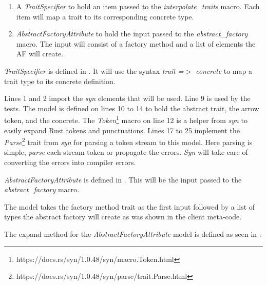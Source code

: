 \begin{enumerate}
	\item A \textit{TraitSpecifier} to hold an item passed to the \textit{interpolate\_traits} macro.
	      Each item will map a trait to its corresponding concrete type.
	\item \textit{AbstractFactoryAttribute} to hold the input passed to the \textit{abstract\_factory} macro.
	      The input will consist of a factory method and a list of elements the AF will create.
\end{enumerate}

\textit{TraitSpecifier} is defined in .
It will use the syntax \textit{trait =$>$ concrete} to map a trait type to its concrete definition.


Lines 1 and 2 import the \textit{syn} elements that will be used.
Line 9 is used by the tests.
The model is defined on lines 10 to 14 to hold the abstract trait, the arrow token, and the concrete.
The \textit{Token}\footnote{https://docs.rs/syn/1.0.48/syn/macro.Token.html} macro on line 12 is a helper from \textit{syn} to easily expand Rust tokens and punctuations.
Lines 17 to 25 implement the \textit{Parse}\footnote{https://docs.rs/syn/1.0.48/syn/parse/trait.Parse.html} trait from \textit{syn} for parsing a token stream to this model.
Here parsing is simple, \textit{parse} each stream token or propagate the errors.
\textit{Syn} will take care of converting the errors into compiler errors.

\textit{AbstractFactoryAttribute} is defined in .
This will be the input passed to the \textit{abstract\_factory} macro.


The model takes the factory method trait as the first input followed by a list of types the abstract factory will create as was shown in the client meta-code.

The expand method for the \textit{AbstractFactoryAttribute} model is defined as seen in .


